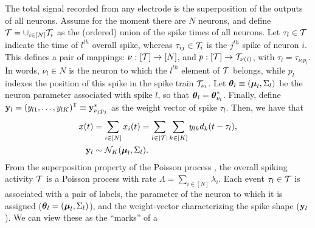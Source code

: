 
{The total signal recorded from any electrode  is the superposition of the outputs of all neurons. Assume for the moment there are $N$
neurons, and define $\mathcal{T} = \cup_{i \in [N]} \mathcal{T}_i$ as
the (ordered) union of the spike times of all neurons. 
Let $\tau_l \in \mathcal{T}$ indicate the time of $l^{th}$ overall spike, whereas $\tau_{ij} \in \mathcal{T}_i$ is the $j^{th}$ spike of neuron $i$.
This defines a pair of mappings: $\nu:[\mathcal{T}]\rightarrow [N]$, and $p:[\mathcal{T}]\rightarrow \mathcal{T}_{\nu(i)}$, with %
$\tau_l = \tau_{\nu_l p_l}$. In words, $\nu_l \in N$ is the neuron to which the $l^{th}$ element of $\mathcal{T}$ belongs, 
while $p_l$ indexes the position of this spike in the spike train $\mathcal{T}_{\nu_l}$.
Let $\boldsymbol{\theta}_l \equiv (\boldsymbol{\mu}_l, \Sigma_l)$ be the neuron parameter associated with spike $l$, so that $\boldsymbol{\theta}_l = \boldsymbol{\theta}^*_{\nu_l}$. 
Finally, define $\mathbf{y}_l=(y_{l1}, \ldots, y_{lK})^{\mathsf{T}} \equiv \mathbf{y}^*_{\nu_j p_j}$ as the weight vector of spike $\tau_l$. Then, we have that}
\begin{subequations}
\begin{align}
  x(t) &= \sum_{i \in [N]} x_{i}(t) =   \sum_{l \in |\mathcal{T}|} \sum_{k \in [K]} y_{lk} d_k(t - \tau_{l}),  \label{eq:spk_sup} \\
  \mathbf{y}_{l} & \sim \mathcal{N}_K(\boldsymbol{\mu}_{l}, \Sigma_{l}). \label{eq:spk_shape}
\end{align}
\end{subequations}
% 
From the superposition property of the Poisson process \citep{kingman93}, the overall spiking activity $\mathcal{T}$ is a 
Poisson process with rate $\Lambda = \sum_{i \in [N]} \lambda_i$. Each event $\tau_l \in \mathcal{T}$ is associated with a pair of labels, the parameter of the neuron to which it 
is assigned ($\boldsymbol{\theta}_l = (\boldsymbol{\mu}_l, \Sigma_l)$), and the weight-vector characterizing the spike shape ($\mathbf{y}_l$). We can view these as the ``marks'' of a 
